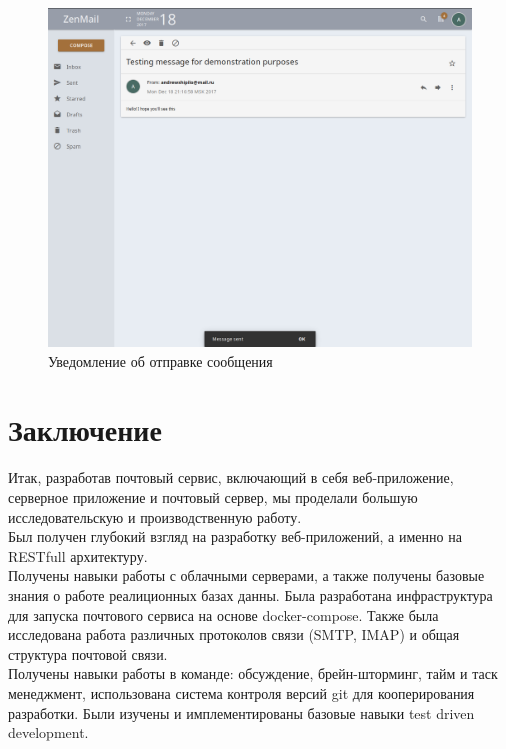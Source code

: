 \documentclass{article}
\begin{document}
\begin{figure}[H]
        \begin{flushleft}        \centerline{\includegraphics[scale=0.6]{messagesent.png}}
        \caption{Уведомление об отправке сообщения}
        \end{flushleft}
\end{figure}
\newpage

\section{Заключение}
Итак, разработав почтовый сервис, включающий в себя веб-приложение, серверное приложение и почтовый сервер, мы проделали большую исследовательскую и производственную работу. \\

Был получен глубокий взгляд на разработку веб-приложений, а именно на RESTfull архитектуру. \\

Получены навыки работы с облачными серверами, а также получены базовые знания о работе реалиционных базах данны. Была разработана инфраструктура для запуска почтового сервиса на основе docker-compose. Также была исследована работа различных протоколов связи (SMTP, IMAP) и общая структура почтовой связи. \\

Получены навыки работы в команде: обсуждение, брейн-шторминг, тайм и таск менеджмент, использована система контроля версий git для кооперирования разработки. Были изучены и имплементированы базовые навыки test driven development. 
\end{document}
